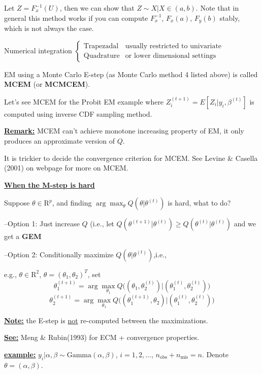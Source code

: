 \documentclass[12pt,letterpaper]{article}
\newcommand{\argmax}{\arg\!\max}
\begin{document}
Let $Z=F_x^{-1}(U)$, then we can show that $Z\sim X|X\in(a,b)$. Note that in general  this method works if you can  compute $F_x^{-1}$, $F_x(a)$, $F_y(b)$ stably, which is not always the case.

Numerical integration $\left\{\begin{array}{cc}\text{Trapezadal} & \text{usually restricted to univariate} \\ \text{Quadrature} & \text{or lower dimensional settings}\end{array}\right.$

\vspace{0.1in}
EM using a Monte Carlo E-step (as Monte Carlo method 4 listed above) is called \textbf{MCEM} (or \textbf{MCMCEM}).

Let's see MCEM for the Probit EM example where $Z_i^{(t+1)} = E[Z_i|y_i,\beta^{(t)}]$ is computed using inverse CDF sampling method.

\vspace{0.2in}
\underline{\textbf{Remark:}} MCEM can't achieve monotone increasing property of EM, it only produces an approximate version of $Q$. 

It is trickier to decide the convergence criterion for MCEM. See Levine \& Casella (2001) on webpage for more on MCEM. 

\vspace{0.2in}
\underline{\textbf{When the M-step is hard}}

Suppose $\theta \in \mathrm{R}^p$, and finding $\argmax_\theta Q(\theta|\theta^{(t)})$ is hard, what to do?

--Option 1: Just increase $Q$ (i.e., let $Q(\theta^{(t+1)}|\theta^{(t)}) \geq Q(\theta^{(t)}|\theta^{(t)})$ and we get a \textbf{GEM}

--Option 2: Conditionally maximize $Q(\theta|\theta^{(t)})$,i.e., 

e.g., $\theta \in \mathrm{R}^2$, $\theta=(\theta_1,\theta_2)^T$, set 
\[\theta_1^{(t+1)} = \argmax_{\theta_1} Q\big((\theta_1,\theta_2^{(t)})|(\theta_1^{(t)},\theta_2^{(t)} )\big)\]
\[\theta_2^{(t+1)} = \argmax_{\theta_1} Q\big((\theta_1^{(t+1)},\theta_2)|(\theta_1^{(t)},\theta_2^{(t)} )\big)\]

\underline{\textbf{Note:}} the E-step is \underline{not} re-computed between the maximizations.

\underline{\textbf{See:}} Meng \& Rubin(1993) for ECM + convergence properties.

\vspace{0.2in}
\textbf{\underline{example:}  } $y_i|\alpha,\beta \sim \text{Gamma}(\alpha,\beta)$, $i=1,2,\ldots$, $n_{\text{obs}}+n_{\text{mis}}=n$. Denote $\theta=(\alpha,\beta)$.
\end{document}
